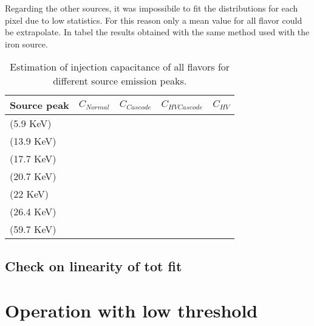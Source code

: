 Regarding the other sources, it was impossibile to fit the distributions for each pixel due to low statistics. For this reason only a mean value for all flavor could be extrapolate. In tabel  the results obtained with the same method used with the iron source.

\begin{table}[h!]
\centering
\begin{tabular}{>{} C{3cm}|C{2.4cm}|C{2.4cm}|C{2.4cm}|C{2.4cm}}
Source peak & $C_{Normal}$ & $C_{Cascode}$ & $C_{HV Cascode}$ & $C_{HV}$\\[2ex]
\hline
{} (5.9 KeV) &  & & & \\[0.5ex]
\hline
{} (13.9 KeV) &  & & &\\[0.5ex]
\hline
{} (17.7 KeV) &  & & &\\[0.5ex]
\hline
{} (20.7 KeV) &  & & &\\[0.5ex]
\hline
{} (22 KeV)&  & & &\\[0.5ex]
\hline
{} (26.4 KeV)&  & & &\\[0.5ex]
\hline
{} (59.7 KeV)&  & & &\\
\hline
\end{tabular}
\caption{Estimation of injection capacitance of all flavors for different source emission peaks.}
\label{tab:cap_mean}
\end{table}





\subsection{Check on linearity of tot fit}



\section{Operation with low threshold}

